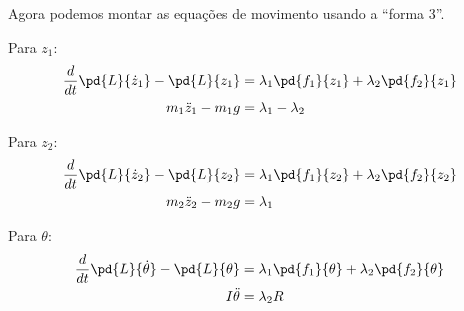 \begin{question}
\begin{solution}
      Agora podemos montar as equações de movimento usando a ``forma 3''.

      Para $z_1$:
      \begin{align*}
        \frac{d}{dt}\pd{L}{\dot z_1} - \pd{L}{z_1} &= \lambda_1 \pd{f_1}{z_1} + \lambda_2 \pd{f_2}{z_1} \\
        m_1\ddot z_1 - m_1g &= \lambda_1 - \lambda_2
      \end{align*}

      Para $z_2$:
      \begin{align*}
        \frac{d}{dt}\pd{L}{\dot z_2} - \pd{L}{z_2} &= \lambda_1 \pd{f_1}{z_2} + \lambda_2 \pd{f_2}{z_2} \\
        m_2\ddot z_2 - m_2g &= \lambda_1
      \end{align*}

      Para $\theta$:
      \begin{align*}
        \frac{d}{dt}\pd{L}{\dot \theta} - \pd{L}{\theta} &= \lambda_1 \pd{f_1}{\theta} + \lambda_2 \pd{f_2}{\theta} \\
        I\ddot \theta &= \lambda_2R
      \end{align*}
    \end{solution}
\end{question}